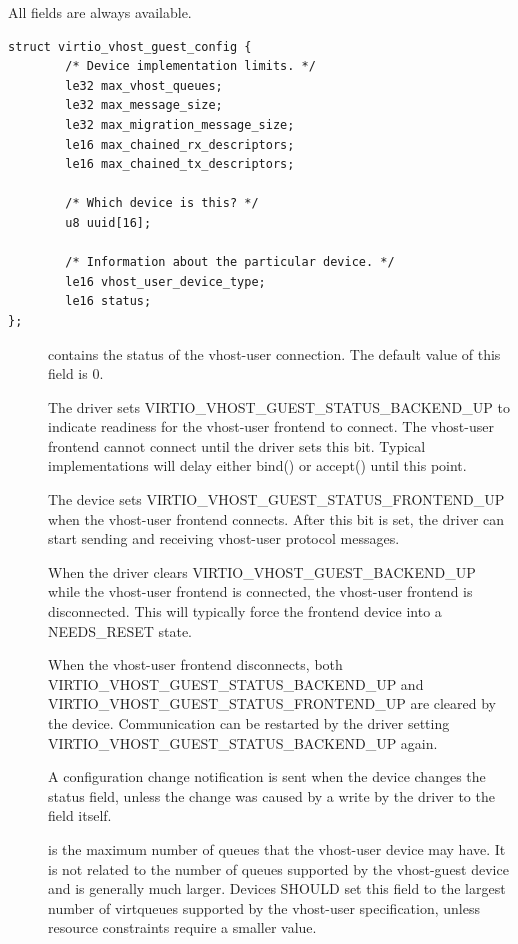 All fields are always available.

\begin{lstlisting}
struct virtio_vhost_guest_config {
        /* Device implementation limits. */
        le32 max_vhost_queues;
        le32 max_message_size;
        le32 max_migration_message_size;
        le16 max_chained_rx_descriptors;
        le16 max_chained_tx_descriptors;

        /* Which device is this? */
        u8 uuid[16];

        /* Information about the particular device. */
        le16 vhost_user_device_type;
        le16 status;
};
\end{lstlisting}

\begin{description}
\item[] contains the status of the vhost-user connection.
    The default value of this field is 0.

    The driver sets VIRTIO_VHOST_GUEST_STATUS_BACKEND_UP to
    indicate readiness for the vhost-user frontend to connect.
    The vhost-user frontend cannot connect until the driver
    sets this bit. Typical implementations will delay either
    bind() or accept() until this point.

    The device sets VIRTIO_VHOST_GUEST_STATUS_FRONTEND_UP when the
    vhost-user frontend connects. After this bit is set, the
    driver can start sending and receiving vhost-user protocol
    messages.

    When the driver clears VIRTIO_VHOST_GUEST_BACKEND_UP while
    the vhost-user frontend is connected, the vhost-user
    frontend is disconnected. This will typically force the
    frontend device into a NEEDS_RESET state.

    When the vhost-user frontend disconnects,
    both VIRTIO_VHOST_GUEST_STATUS_BACKEND_UP and
    VIRTIO_VHOST_GUEST_STATUS_FRONTEND_UP are cleared by the
    device. Communication can be restarted by the driver
    setting VIRTIO_VHOST_GUEST_STATUS_BACKEND_UP again.

    A configuration change notification is sent when the
    device changes the status field, unless the change was caused
    by a write by the driver to the field itself.

\item[] is the maximum number of queues
    that the vhost-user device may have. It is not related to the
    number of queues supported by the vhost-guest device and is
    generally much larger. Devices SHOULD set this field to the
    largest number of virtqueues supported by the vhost-user
    specification, unless resource constraints require a smaller
    value.


\end{description}
